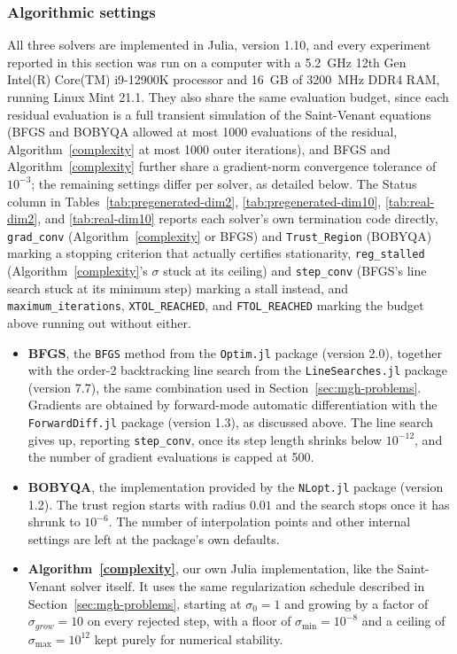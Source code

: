 \documentclass[11pt]{article}
\begin{document}
\subsubsection{Algorithmic settings}

All three solvers are implemented in Julia, version 1.10, and every
experiment reported in this section was run on a computer with a
5.2~GHz 12th Gen Intel(R) Core(TM) i9-12900K processor and 16~GB of
3200~MHz DDR4 RAM, running Linux Mint 21.1. They also share the same
evaluation budget, since each residual evaluation is a full transient
simulation of the Saint-Venant equations (BFGS and BOBYQA allowed at
most 1000 evaluations of the residual, Algorithm~\ref{complexity} at
most 1000 outer iterations), and BFGS and Algorithm~\ref{complexity}
further share a gradient-norm convergence tolerance of $10^{-3}$; the
remaining settings differ per solver, as detailed below. The Status
column in Tables~\ref{tab:pregenerated-dim2}, \ref{tab:pregenerated-dim10},
\ref{tab:real-dim2}, and \ref{tab:real-dim10} reports each solver's own
termination code directly, \texttt{grad\_conv} (Algorithm~\ref{complexity}
or BFGS) and \texttt{Trust\_Region} (BOBYQA) marking a stopping
criterion that actually certifies stationarity, \texttt{reg\_stalled}
(Algorithm~\ref{complexity}'s $\sigma$ stuck at its ceiling) and
\texttt{step\_conv} (BFGS's line search stuck at its minimum step)
marking a stall instead, and \texttt{maximum\_iterations},
\texttt{XTOL\_REACHED}, and \texttt{FTOL\_REACHED} marking the budget
above running out without either.

\begin{itemize}
    \item \textbf{BFGS}, the \texttt{BFGS} method from the
    \texttt{Optim.jl} package (version 2.0), together with the order-2
    backtracking line search from the \texttt{LineSearches.jl} package
    (version 7.7), the same combination used in
    Section~\ref{sec:mgh-problems}. Gradients are obtained by
    forward-mode automatic differentiation with the
    \texttt{ForwardDiff.jl} package (version 1.3), as discussed above.
    The line search gives up, reporting \texttt{step\_conv}, once its
    step length shrinks below $10^{-12}$, and the number of gradient
    evaluations is capped at 500.
    \item \textbf{BOBYQA}, the implementation provided by the
    \texttt{NLopt.jl} package (version 1.2). The trust region starts
    with radius $0.01$ and the search stops once it has shrunk to
    $10^{-6}$. The number of interpolation points and other internal
    settings are left at the package's own defaults.
    \item \textbf{Algorithm~\ref{complexity}}, our own Julia
    implementation, like the Saint-Venant solver itself. It uses the
    same regularization schedule described in Section~\ref{sec:mgh-problems},
    starting at $\sigma_0=1$ and growing by a factor of
    $\sigma_{grow}=10$ on every rejected step, with a floor of
    $\sigma_{\min}=10^{-8}$ and a ceiling of $\sigma_{\max}=10^{12}$
    kept purely for numerical stability.
\end{itemize}
\end{document}
